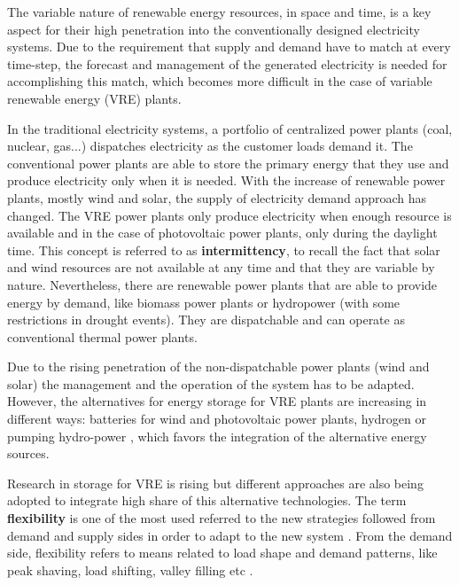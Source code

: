 The variable nature of renewable energy resources, in space and time, is a key aspect for their high penetration into the conventionally designed electricity systems. Due to the requirement that supply and demand have to match at every time-step, the forecast and management of the generated electricity is needed for accomplishing this match, which becomes more difficult in the case of variable renewable energy (VRE) plants.


In the traditional electricity systems, a portfolio of centralized power plants (coal, nuclear, gas...) dispatches electricity as the customer loads demand it. The conventional power plants are able to store the primary energy that they use and produce electricity only when it is needed. With the increase of renewable power plants, mostly wind and solar, the supply of electricity demand approach has changed. The VRE power plants only produce electricity when enough resource is available and in the case of photovoltaic power plants, only during the daylight time. This concept is referred to as \textbf{intermittency}, to recall the fact that solar and wind resources are not available at any time and that they are variable by nature. Nevertheless, there are renewable power plants that are able to provide energy by demand, like biomass power plants or hydropower (with some restrictions in drought events). They are dispatchable and can operate as conventional thermal power plants.

Due to the rising penetration of the non-dispatchable power plants (wind and solar) the management  and the operation of the system has to be adapted. However, the alternatives for energy storage for VRE plants are increasing in different ways: batteries for wind and photovoltaic power plants, hydrogen or pumping hydro-power \cite*{Lund2015, Blanco2018, Schaber2004}, which favors the integration of the alternative energy sources.

Research in storage for VRE is rising but different approaches are also being adopted to integrate high share of this alternative technologies. The term \textbf{flexibility} is one of the most used referred to the new strategies followed from demand and supply sides in order to adapt to the new system \cite*{KROPOSKI2017}. From the demand side, flexibility refers to means related to load shape and demand patterns, like peak shaving, load shifting, valley filling etc \cite*{Lund2015}.

